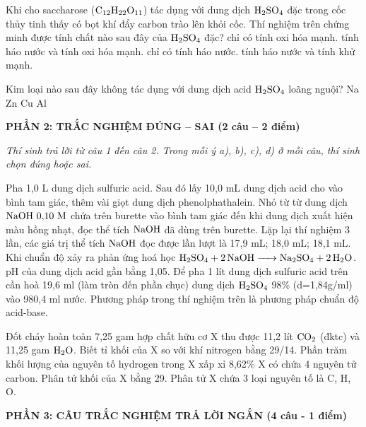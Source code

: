 \documentclass[11pt,a4paper]{article}
\begin{document}
\begin{ex}
Khi cho saccharose ($\ce{C12H22O11}$) tác dụng với dung dịch $\ce{H2SO4}$ đặc trong cốc thủy tinh thấy có bọt khí đẩy carbon trào lên khỏi cốc. Thí nghiệm trên chứng minh được tính chất nào sau đây của $\ce{H2SO4}$ đặc?
\choice
{chỉ có tính oxi hóa mạnh.}
{tính háo nước và tính oxi hóa mạnh.}
{chỉ có tính háo nước.}
{tính háo nước và tính khử mạnh.}
\loigiai{}
\end{ex}
\begin{ex}
Kim loại nào sau đây không tác dụng với dung dịch acid $\ce{H2SO4}$ loãng nguội?
\choice
{Na}
{Zn}
{Cu}
{Al}
\loigiai{}
\end{ex}

\vspace{6pt}
{\large\bfseries\color{mainGreen} PHẦN 2: TRẮC NGHIỆM ĐÚNG -- SAI (2 câu -- 2 điểm)}

\textit{Thí sinh trả lời từ câu 1 đến câu 2. Trong mỗi ý a), b), c), d) ở mỗi câu, thí sinh chọn đúng hoặc sai.}
\vspace{4pt}
\begin{ex}
Pha 1,0 L dung dịch sulfuric acid. Sau đó lấy 10,0 mL dung dịch acid cho vào bình tam giác, thêm vài giọt dung dịch phenolphathalein. Nhỏ từ từ dung dịch $\ce{NaOH}\ 0{,}10\text{ M}$ chứa trên burette vào bình tam giác đến khi dung dịch xuất hiện màu hồng nhạt, đọc thể tích $\ce{NaOH}$ đã dùng trên burette. Lặp lại thí nghiệm 3 lần, các giá trị thể tích $\ce{NaOH}$ đọc được lần lượt là 17,9 mL; 18,0 mL; 18,1 mL.
\choiceTF
{ Khi chuẩn độ xảy ra phản ứng hoá học $\ce{H2SO4 + 2NaOH -> Na2SO4 + 2H2O}$.}
{ pH của dung dịch acid gần bằng 1,05.}
{ Để pha 1 lít dung dịch sulfuric acid trên cần hoà 19,6 ml (làm tròn đến phần chục) dung dịch $\ce{H2SO4}$ 98\% (d=1,84g/ml) vào 980,4 ml nước.}
{ Phương pháp trong thí nghiệm trên là phương pháp chuẩn độ acid-base.}
\loigiai{}
\end{ex}
\begin{ex}
Đốt cháy hoàn toàn 7,25 gam hợp chất hữu cơ X thu được 11,2 lít $\ce{CO2}$ (đktc) và 11,25 gam $\ce{H2O}$. Biết tỉ khối của X so với khí nitrogen bằng 29/14.
\choiceTF
{ Phần trăm khối lượng của nguyên tố hydrogen trong X xấp xỉ 8,62\%}
{ X có chứa 4 nguyên tử carbon.}
{ Phân tử khối của X bằng 29.}
{ Phân tử X chứa 3 loại nguyên tố là C, H, O.}
\loigiai{}
\end{ex}

\vspace{6pt}
{\large\bfseries\color{mainGreen} PHẦN 3: CÂU TRẮC NGHIỆM TRẢ LỜI NGẮN (4 câu - 1 điểm)}
\end{document}
